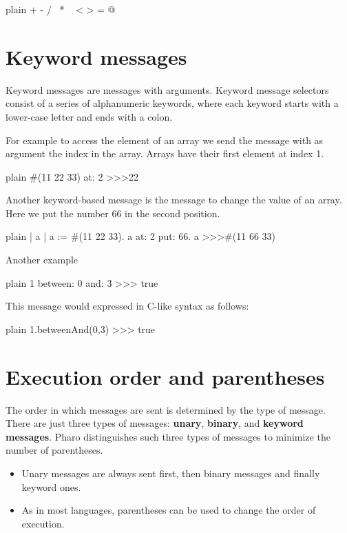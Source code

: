 \documentclass[10pt,twoside,english]{_support/latex/sbabook/sbabook}
\begin{document}
\begin{displaycode}{plain}
+ - / \ * ~ < > = @ %
\end{displaycode}
\section{Keyword messages}
Keyword messages are messages with arguments. 
Keyword message selectors consist of a series of alphanumeric keywords, where
each keyword starts with a lower-case letter and ends with a colon.

For example to access the element of an array we send the message  with as argument the index in the array. Arrays have their first element at index 1. 

\begin{displaycode}{plain}
#(11 22 33) at: 2
>>>22
\end{displaycode}

Another keyword-based message is the message  to change the value of an array. 
Here we put the number 66 in the second position. 

\begin{displaycode}{plain}
| a |
a := #(11 22 33).
a at: 2 put: 66.
a
>>>#(11 66 33)
\end{displaycode}

Another example 

\begin{displaycode}{plain}
1 between: 0 and: 3 
>>> true
\end{displaycode}

This message would expressed in C-like syntax as follows: 

\begin{displaycode}{plain}
1.betweenAnd(0,3) 
>>> true
\end{displaycode}
\section{Execution order and parentheses}
The order in which messages are sent is determined by the type of
message. There are just three types of messages: \textbf{unary}, \textbf{binary}, and \textbf{keyword
messages}. Pharo distinguishes such three types of messages to minimize the number of parentheses. 

\begin{itemize}
\item Unary messages are always sent first, then binary messages and finally keyword ones. 
\item As in most languages, parentheses can be used to change the order of execution.
\end{itemize}
\end{document}
